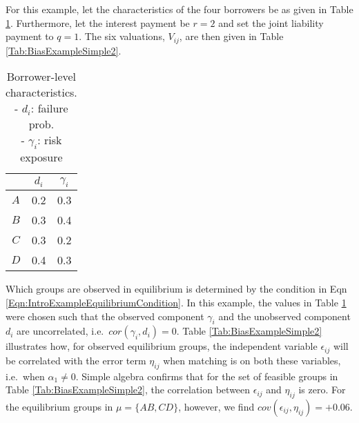 For this example, let the characteristics of the four borrowers be as given in Table \ref{Tab:BiasExampleSimple1}. Furthermore, let the interest payment be $r=2$ and set the joint liability payment to $q=1$. The six valuations, $V_{ij}$, are then given in Table \ref{Tab:BiasExampleSimple2}.

\begin{table}[htbp!]
  \begin{center}
    \begin{minipage}[c]{0.3\linewidth}
\centering %
      \caption{Borrower-level characteristics. \\ - $d_i$: failure prob. \\ - $\gamma_i$: risk exposure} \label{Tab:BiasExampleSimple1}
    \end{minipage}
    \begin{minipage}[c]{0.6\linewidth}
\centering
\small
\begin{tabular}{c||cc}
& $d_i$ & $\gamma_i$ \\
\hline\hline
\multicolumn{1}{|c||}{$A$} & 0.2 & \multicolumn{1}{c|}{0.3}\\
\multicolumn{1}{|c||}{$B$} & 0.3 & \multicolumn{1}{c|}{0.4} \\
\hline\hline
\multicolumn{1}{|c||}{$C$} & 0.3 & \multicolumn{1}{c|}{0.2} \\
\multicolumn{1}{|c||}{$D$} & 0.4 & \multicolumn{1}{c|}{0.3} \\
\hline\hline
\end{tabular}
    \end{minipage}
  \end{center}
\end{table}

\noindent Which groups are observed in equilibrium is determined by the condition in Eqn \ref{Eqn:IntroExampleEquilibriumCondition}. In this example, the values in Table \ref{Tab:BiasExampleSimple1} were chosen such that the observed component $\gamma_i$ and the unobserved component $d_i$ are uncorrelated, i.e.\ $cor(\gamma_i,d_i)=0$. Table \ref{Tab:BiasExampleSimple2} illustrates how, for observed equilibrium groups, the independent variable $\epsilon_{ij}$ will be correlated with the error term $\eta_{ij}$ when matching is on both these variables, i.e.\ when $\alpha_1\neq 0$. Simple algebra confirms that for the set of feasible groups in Table \ref{Tab:BiasExampleSimple2}, the correlation between $\epsilon_{ij}$ and $\eta_{ij}$ is zero. For the equilibrium groups in $\mu=\{ AB,CD \}$, however, we find $cov(\epsilon_{ij}, \eta_{ij})=+0.06$.


